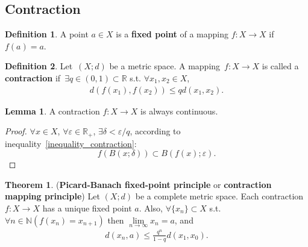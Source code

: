 \documentclass{article}
\theoremstyle{plain}
\theoremstyle{definition}
\newtheorem{dfn}{Definition}[section] %
\newtheorem{thrm}{Theorem}[section] %
\newtheorem{lmm}{Lemma} %
\begin{document}
\subsection{Contraction}
\begin{dfn}\label{fixed_point}
A point $a\in X$ is a \textbf{fixed point} of a mapping $f: X\to X$ if $f( a) = a$.
\end{dfn}
\begin{dfn}\label{contraction}
Let~$(X;d)$ be a metric space. A mapping~$f: X\to X$ is called a \textbf{contraction} if~$\exists q \in ( 0, 1) \subset \mathbb{R}$ s.t. $\forall x_1,x_2\in X$, 
\begin{align}\label{inequality_contraction}
	d ( f ( x_1), f (x_2)) \leq q d( x_1, x_2).
\end{align}
\end{dfn}
\begin{lmm}\label{contraction_continuous}
A contraction $f: X\to X$ is always continuous.
\end{lmm}
\begin{proof}
$\forall x\in X$, $\forall \varepsilon \in \mathbb{R}_+ $, $\exists \delta < \varepsilon / q$, according to inequality~\ref{inequality_contraction}:
\[
f \left( B( x;\delta )\right) 
\subset 
B\left( f( x); \varepsilon \right).
\]
\end{proof}
\begin{thrm}\label{contraction_mapping_principle}
(\textbf{Picard-Banach fixed-point principle} or \textbf{contraction mapping principle})
Let $( X; d)$ be a complete metric space. Each contraction $f: X\to X$ has a unique fixed point $a$. 
Also, $\forall \{x_n\} \subset X$ s.t.
$\forall n \in \mathbb{N}
\left(f ( x_n) = x_{n+1} \right)$ then $\lim\limits_{n\to \infty} x_n = a$, and
\begin{align}\label{inequality_fixed-point_principle}
	d( x_n, a) \leq \frac{q^n}{1-q} d( x_1, x_0).
\end{align}
\end{thrm}
\end{document}
